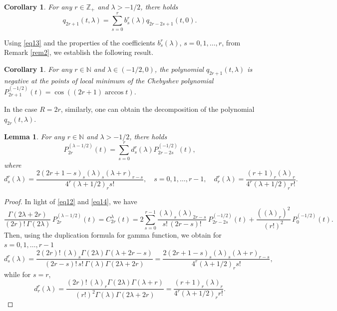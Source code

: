 \documentclass[12pt,twoside,reqno]{amsart}\usepackage[cp1251]{inputenc}
\theoremstyle{plain}
\newtheorem{lemma}[theorem]{Lemma}
\newtheorem{corollary}[theorem]{Corollary}
\theoremstyle{remark}
\newcommand\sign{\operatorname{sign}}
\begin{document}
\begin{corollary}\label{cor2}
For any $r\in\mathbb{Z}_+$ and $\lambda>-1/2$, there holds
\[
q_{2r+1}(t,\lambda)=\sum_{s=0}^{r}b_s^r(\lambda)q_{2r-2s+1}(t,0).%
\]
\end{corollary}

Using \eqref{eq13} and
the properties of the coefficients $b_s^r(\lambda)$, $s=0,1,\dots,r$, from
Remark \ref{rem2}, we establish the following result.


\begin{corollary}\label{cor3}
For any $r\in\mathbb{N}$ and $\lambda\in (-1/2,0)$,
the polynomial $q_{2r+1}(t,\lambda)$ is negative at the points
of local minimum of the Chebyshev polynomial $P_{2r+1}^{(-1/2)}(t)=
\cos{}(({2r+1})\arccos t)$.
\end{corollary}

In the case $R=2r$,
similarly, one can obtain the decomposition of the polynomial $q_{2r}(t,\lambda)$.

\begin{lemma}%
For any  $r\in\mathbb{N}$ and $\lambda>-1/2$, there holds %
\[
P_{2r}^{(\lambda-1/2)}(t)=\sum_{s=0}^{r}d_s^r(\lambda)P_{2r-2s}^{(-1/2)}(t),
\]
where
\[
d_s^r(\lambda)=\frac{2(2r+1-s)_{s}(\lambda)_{s}(\lambda+r)_{r-s}}{4^r(\lambda+1/2)_{r}s!},\quad
s=0,1,\dots,r-1,\quad
d_r^r(\lambda)=\frac{(r+1)_{r}(\lambda)_{r}}{4^r(\lambda+1/2)_{r}r!}.
\]
\end{lemma}

\medskip
\begin{proof}
In light of  \eqref{eq12} and \eqref{eq14}, we have
\[
\frac{\Gamma(2\lambda+2r)}{(2r)!\,\Gamma(2\lambda)}\,P_{2r}^{(\lambda-1/2)}(t)=
C_ {2r}^{\lambda}(t)=2\sum_{s=0}^{{r-1}}\frac{(\lambda)_s(\lambda)_{2r-s}}{s!\,(2r-s)!}\,P_{2r-2s}^{(-1/2)}(t)+\frac{((\lambda)_r)^2}{(r!)^2}\,P_{0}^{(-1/2)}(t).
\]
Then, using
the duplication formula for gamma function, we obtain for  $s=0,1,\dots,r-1$
\[
d_s^r(\lambda)=
\frac{2(2r)!\,(\lambda)_s\Gamma(2\lambda)\Gamma(\lambda+2r-s)}{(2r-s)!\,s!\,\Gamma(\lambda)\Gamma(2\lambda+2r)}
=\frac{2(2r+1-s)_{s}(\lambda)_{s}(\lambda+r)_{r-s}}{4^r(\lambda+1/2)_{r}s!},
\]
while for  $s=r$,
\[
d_r^r(\lambda)=\frac{(2r)!\,(\lambda)_r\Gamma(2\lambda)\Gamma(\lambda+r)}{(r!)^{2}\Gamma(\lambda)\Gamma(2\lambda+2r)}
=\frac{(r+1)_{r}(\lambda)_{r}}{4^r(\lambda+1/2)_{r}r!}.
\]
\end{proof}
\end{document}
